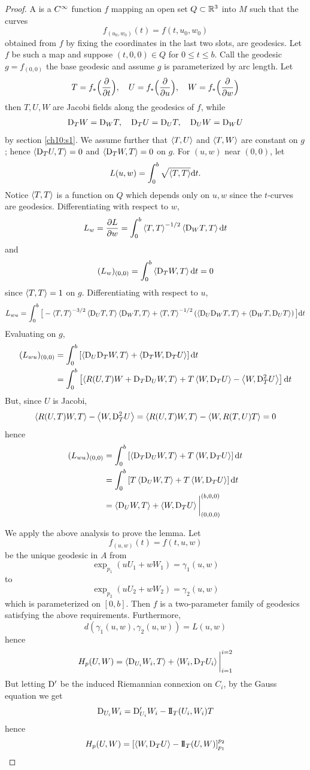 \documentclass[../main]{subfiles}
\begin{document}
\begin{proof}
A  is a $C^\infty$ function $f$ mapping an open set $Q\subset\mathbb{R}^3$ into $M$ such that the curves
\[f_{(u_0,w_0)}(t) = f(t,u_0,w_0)\]
obtained from $f$ by fixing the coordinates in the last two slots, are geodesics. Let $f$ be such a map and suppose $(t,0,0)\in Q$ for $0\le t\le b$. Call the geodesic $g=f_{(0,0)}$ the base geodesic and assume $g$ is parameterized by arc length. Let
\[T = f_*\Big(\dfrac{\partial }{\partial t}\Big),
\quad U = f_*\Big(\dfrac{\partial }{\partial u}\Big),
\quad W = f_*\Big(\dfrac{\partial }{\partial w}\Big)\]
then $T,U,W$ are Jacobi fields along the geodesics of $f$, while
\[\mathrm{D}_TW = \mathrm{D}_WT,
\quad \mathrm{D}_TU = \mathrm{D}_UT,
\quad \mathrm{D}_UW = \mathrm{D}_WU\]
by section \ref{ch10:s1}. We assume further that $\left\langle T,U\right\rangle$ and $\left\langle T,W\right\rangle$ are constant on $g$; hence $\left\langle\mathrm{D}_TU,T\right\rangle=0$ and $\left\langle\mathrm{D}_TW,T\right\rangle=0$ on $g$. For $(u,w)$ near $(0,0)$, let
\[L(u,w) = \int_0^b\sqrt{\left\langle T,T\right\rangle}\mathrm{d}t.\]
Notice $\left\langle T,T\right\rangle$ is a function on $Q$ which depends only on $u,w$ since the $t$-curves are geodesics. Differentiating with respect to $w$,
\[L_w = \dfrac{\partial L}{\partial w}
= \int_0^b\left\langle T,T\right\rangle^{-1/2}\left\langle\mathrm{D}_WT,T\right\rangle\mathrm{d}t\]
and
\[(L_w)_{(0,0)} = \int_0^b\left\langle\mathrm{D}_TW,T\right\rangle\mathrm{d}t = 0\]
since $\left\langle T,T\right\rangle=1$ on $g$. Differentiating with respect to $u$,
\[L_{wu} =\int_0^b\big[-\left\langle T,T\right\rangle^{-3/2}\left\langle\mathrm{D}_UT,T\right\rangle\left\langle\mathrm{D}_WT,T\right\rangle
+\left\langle T,T\right\rangle^{-1/2}\left(\left\langle\mathrm{D}_U\mathrm{D}_WT,T\right\rangle+\left\langle\mathrm{D}_WT,\mathrm{D}_UT\right\rangle\right)\big]\mathrm{d}t\]
Evaluating on $g$,
\begin{align*}
    (L_{wu})_{(0,0)}
    &= \int_0^b\left[\left\langle\mathrm{D}_U\mathrm{D}_TW,T\right\rangle+\left\langle\mathrm{D}_TW,\mathrm{D}_TU\right\rangle\right]\mathrm{d}t \\
    &= \int_0^b\left[\left\langle R(U,T)W+\mathrm{D}_T\mathrm{D}_UW,T\right\rangle + T\left\langle W,\mathrm{D}_TU\right\rangle - \left\langle W,\mathrm{D}_T^2U\right\rangle\right]\mathrm{d}t
\end{align*}
But, since $U$ is Jacobi,
\[\left\langle R(U,T)W,T\right\rangle - \left\langle W,\mathrm{D}_T^2U\right\rangle = \left\langle R(U,T)W,T\right\rangle - \left\langle W,R(T,U)T\right\rangle = 0\]
hence
\begin{align*}
    (L_{wu})_{(0,0)}
    &= \int_0^b\left[\left\langle\mathrm{D}_T\mathrm{D}_UW,T\right\rangle + T\left\langle W,\mathrm{D}_TU\right\rangle\right]\mathrm{d}t \\
    &=\int_0^b\left[T\left\langle\mathrm{D}_UW,T\right\rangle + T\left\langle W,\mathrm{D}_TU\right\rangle\right]\mathrm{d}t \\
    &= \left\langle\mathrm{D}_UW,T\right\rangle + \left\langle W,\mathrm{D}_TU\right\rangle\bigg|_{(0,0,0)}^{(b,0,0)}
\end{align*}

We apply the above analysis to prove the lemma. Let
\[f_{(u,w)}(t) = f(t,u,w)\]
be the unique geodesic in $A$ from
\[\exp_{p_1}(uU_1+wW_1) = \gamma_1(u,w)\]
to
\[\exp_{p_2}(uU_2+wW_2) = \gamma_2(u,w)\]
which is parameterized on $[0,b]$. Then $f$ is a two-parameter family of geodesics satisfying the above requirements. Furthermore,
\[d(\gamma_1(u,w),\gamma_2(u,w)) = L(u,w)\]
hence
\[H_p(U,W) = \left\langle\mathrm{D}_{U_i}W_i,T\right\rangle + \left\langle W_i,\mathrm{D}_TU_i\right\rangle\bigg|_{i=1}^{i=2}\]
But letting $\mathrm{D}'$ be the induced Riemannian connexion on $C_i$, by the Gauss equation we get
\[\mathrm{D}_{U_i}W_i = \mathrm{D}'_{U_i}W_i - \mathrm{I\!I}_T(U_i,W_i)T\]
hence
\[H_p(U,W) = \left[\left\langle W,\mathrm{D}_TU\right\rangle - \mathrm{I\!I}_T(U,W)\right]_{p_1}^{p_2}\]
\end{proof}
\end{document}
